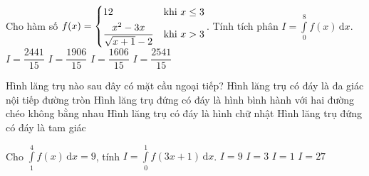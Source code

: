 \begin{ex}%
Cho hàm số $f(x)=\left\{\begin{aligned}&12 &\text{khi }x\le 3\\&\dfrac{x^2-3x}{\sqrt{x+1}-2} &\text{khi }x>3\end{aligned}\right.$. Tính tích phân $I=\displaystyle\int\limits_0^8 f(x)\mathrm{\, d}x$.
\choice
{\True $I=\dfrac{2441}{15}$}
{$I=\dfrac{1906}{15}$}
{$I=\dfrac{1606}{15}$}
{$I=\dfrac{2541}{15}$}
\end{ex}
\begin{ex}%
Hình lăng trụ nào sau đây có mặt cầu ngoại tiếp?
\choice
{Hình lăng trụ có đáy là đa giác nội tiếp đường tròn}
{Hình lăng trụ đứng có đáy là hình bình hành với hai đường chéo không bằng nhau}
{Hình lăng trụ có đáy là hình chữ nhật}
{\True Hình lăng trụ đứng có đáy là tam giác}
\end{ex}
\begin{ex}%
Cho $\displaystyle\int\limits_1^4 f(x)\mathrm{\, d}x=9$, tính $I=\displaystyle\int\limits_0^1 f\left(3x+1\right)\mathrm{\, d}x$.
\choice
{$I=9$}
{\True $I=3$}
{$I=1$}
{$I=27$}
\end{ex}
